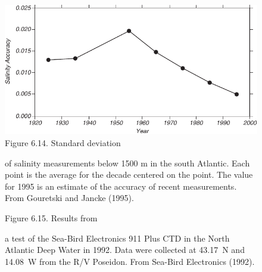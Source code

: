 \begin{figure}[t!]
\includegraphics{pics/salinityaccuracy}
\footnotesize
Figure 6.14. Standard deviation \rule{0mm}{3ex}of salinity
measurements below 1500 m in the south Atlantic. Each point is the
average for the decade centered on the point. The value for 1995 is an
estimate of the accuracy of recent
measurements. From Gouretski and Jancke (1995).
\label{fig:salinityaccuracy}
\vspace{-4ex}
\end{figure}

\begin{figure}[b!]
\vspace{-4ex}
\footnotesize
Figure 6.15. Results from \rule{0pt}{3ex}a test of the Sea-Bird
Electronics 911 Plus CTD in the North Atlantic Deep
Water in 1992. Data were collected at
43.17\degrees\ N and 14.08\degrees\ W from the R/V Poseidon. From
Sea-Bird Electronics (1992).
\label{fig:911data}
\end{figure}

